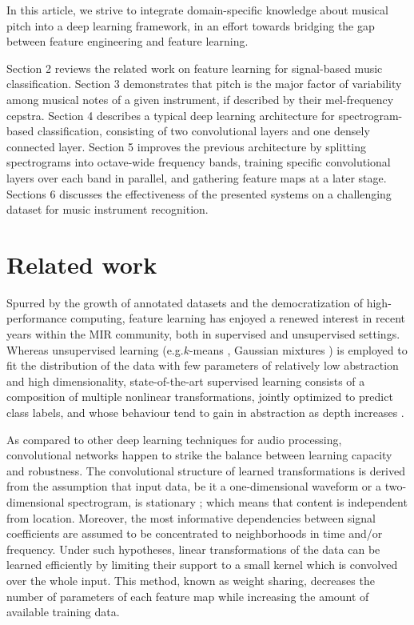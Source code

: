 \documentclass{article}
\makeatletter
\newcommand*{\eg}{e.g.\@\xspace}
\makeatother
\begin{document}
In this article, we strive to integrate domain-specific knowledge about musical
pitch into a deep learning framework, in an effort towards bridging the gap
between feature engineering and feature learning.

Section 2 reviews the related work on feature learning for signal-based music
classification.
Section 3 demonstrates that pitch is the major factor of variability among musical
notes of a given instrument, if described by their mel-frequency cepstra.
Section 4 describes a typical deep learning architecture for spectrogram-based
classification, consisting of two convolutional layers and one densely connected layer.
Section 5 improves the previous architecture by splitting spectrograms into
octave-wide frequency bands, training specific convolutional layers over each band
in parallel, and gathering feature maps at a later stage.
Sections 6 discusses the effectiveness of the presented systems on a challenging
dataset for music instrument recognition.

\section{Related work}
Spurred by the growth of annotated datasets and the democratization of
high-performance computing, feature learning has enjoyed a renewed interest
in recent years within the MIR community, both in supervised and unsupervised
settings.
Whereas unsupervised learning (\eg $k$-means \cite{Stowell2014}, Gaussian
mixtures \cite{Joder2009}) is employed to fit the distribution of the data with
few parameters of relatively low abstraction
and high dimensionality, state-of-the-art supervised learning consists of a
composition of multiple nonlinear transformations, jointly optimized
to predict class labels, and whose behaviour tend to gain in abstraction as depth
increases \cite{vandenOord2013}.

As compared to other deep learning techniques for audio processing,
convolutional networks happen to strike the balance between
learning capacity and robustness.
The convolutional structure of learned transformations is derived from
the assumption that input data, be it a one-dimensional waveform
or a two-dimensional spectrogram, is stationary ; which means that
content is independent from location.
Moreover, the most informative dependencies between signal coefficients
are assumed to be concentrated to neighborhoods in time and/or frequency.
Under such hypotheses, linear transformations of the data can be learned efficiently
by limiting their support to a small kernel which is convolved over
the whole input.
This method, known as weight sharing, decreases the number of parameters
of each feature map while increasing the amount of available training data.
\end{document}
